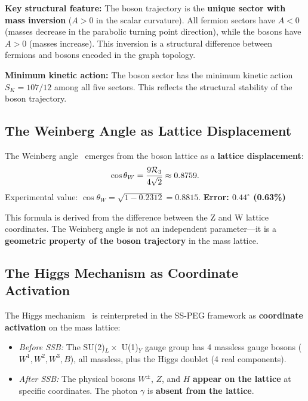 \textbf{Key structural feature:} The boson trajectory is the \textbf{unique sector with mass inversion} ($A > 0$ in the scalar curvature). All fermion sectors have $A < 0$ (masses decrease in the parabolic turning point direction), while the bosons have $A > 0$ (masses increase). This inversion is a structural difference between fermions and bosons encoded in the graph topology.

\textbf{Minimum kinetic action:} The boson sector has the minimum kinetic action $S_K = 107/12$ among all five sectors. This reflects the structural stability of the boson trajectory.

\subsection{The Weinberg Angle as Lattice Displacement}\label{sec:boson_weinberg}

The Weinberg angle~\cite{pdg2024} emerges from the boson lattice as a \textbf{lattice displacement}:
\begin{equation}
\cos\theta_W = \frac{9\mathcal{R}_3}{4\sqrt{2}} \approx 0.8759.
\end{equation}
Experimental value: $\cos\theta_W = \sqrt{1 - 0.2312} = 0.8815$. \textbf{Error: $0.44^\circ$ (0.63\%)}

This formula is derived from the difference between the Z and W lattice coordinates. The Weinberg angle is not an independent parameter---it is a \textbf{geometric property of the boson trajectory} in the mass lattice.

\subsection{The Higgs Mechanism as Coordinate Activation}\label{sec:higgs_mechanism}

The Higgs mechanism~\cite{chamseddine1997spectral} is reinterpreted in the SS-PEG framework as \textbf{coordinate activation} on the mass lattice:

\begin{itemize}
\item \textit{Before SSB:} The SU(2)$_L \times$ U(1)$_Y$ gauge group has 4 massless gauge bosons ($W^1, W^2, W^3, B$), all massless, plus the Higgs doublet (4 real components).
\item \textit{After SSB:} The physical bosons $W^\pm$, $Z$, and $H$ \textbf{appear on the lattice} at specific coordinates. The photon $\gamma$ is \textbf{absent from the lattice}.
\end{itemize}

